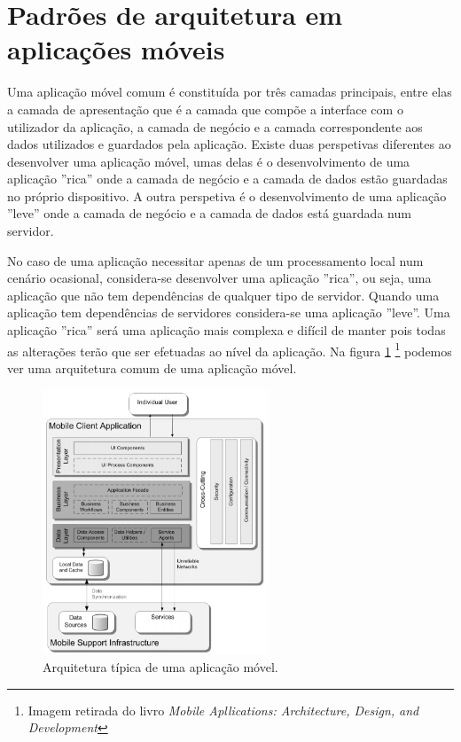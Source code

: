 \newpage
\section{Padrões de arquitetura em aplicações móveis}
Uma aplicação móvel comum é constituída por três camadas principais, entre elas a camada de apresentação que é a camada que compõe a interface com o utilizador da aplicação, a camada de negócio e a camada correspondente aos dados utilizados e guardados pela aplicação. Existe duas perspetivas diferentes ao desenvolver uma aplicação móvel, umas delas é o desenvolvimento de uma aplicação ''rica'' onde a camada de negócio e a camada de dados estão guardadas no próprio dispositivo. A outra perspetiva é o desenvolvimento de uma aplicação ''leve'' onde a camada de negócio e a camada de dados está guardada num servidor. 
\par
No caso de uma aplicação necessitar apenas de um processamento local num cenário ocasional, considera-se desenvolver uma aplicação ''rica'', ou seja, uma aplicação que não tem dependências de qualquer tipo de servidor. Quando uma aplicação tem dependências de servidores considera-se uma aplicação ''leve''. Uma aplicação ''rica'' será uma aplicação mais complexa e difícil de manter pois todas as alterações terão que ser efetuadas ao nível da aplicação.
Na figura \ref{f:mobileapparch} \footnote{Imagem retirada do livro \textit{Mobile Apllications: Architecture, Design, and Development}} podemos ver uma arquitetura comum de uma aplicação móvel. \cite{mobileappbook}

\begin{figure}[H]
  \centering
  \includegraphics[width=0.6\textwidth]{imgs/mobileapparch.png}
  \caption[Arquitetura t\'ipica de uma  aplica\c c\~ao móvel]{Arquitetura t\'ipica de uma  aplica\c c\~ao móvel. \cite{mobileappbook}}
  
  \label{f:mobileapparch}
\end{figure}

